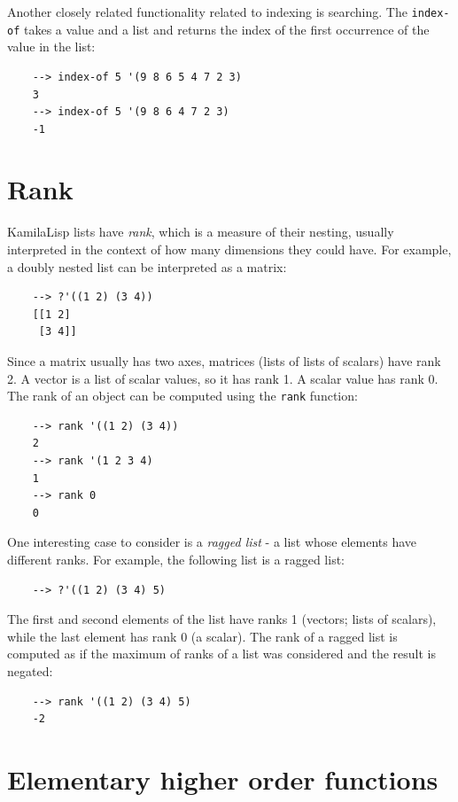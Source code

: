 Another closely related functionality related to indexing is searching. The \verb|index-of| takes a value and a list and returns the index of the first occurrence of the value in the list:

\begin{Verbatim}
    --> index-of 5 '(9 8 6 5 4 7 2 3)
    3
    --> index-of 5 '(9 8 6 4 7 2 3)
    -1
\end{Verbatim}

\section{Rank}

KamilaLisp lists have \textit{rank}, which is a measure of their nesting, usually interpreted in the context of how many dimensions they could have. For example, a doubly nested list can be interpreted as a matrix:

\begin{Verbatim}
    --> ?'((1 2) (3 4))
    [[1 2]
     [3 4]]
\end{Verbatim}

Since a matrix usually has two axes, matrices (lists of lists of scalars) have rank 2. A vector is a list of scalar values, so it has rank 1. A scalar value has rank 0. The rank of an object can be computed using the \verb|rank| function:

\begin{Verbatim}
    --> rank '((1 2) (3 4))
    2
    --> rank '(1 2 3 4)
    1
    --> rank 0
    0
\end{Verbatim}

One interesting case to consider is a \textit{ragged list} - a list whose elements have different ranks. For example, the following list is a ragged list:

\begin{Verbatim}
    --> ?'((1 2) (3 4) 5)
\end{Verbatim}

The first and second elements of the list have ranks 1 (vectors; lists of scalars), while the last element has rank 0 (a scalar). The rank of a ragged list is computed as if the maximum of ranks of a list was considered and the result is negated:

\begin{Verbatim}
    --> rank '((1 2) (3 4) 5)
    -2
\end{Verbatim}

\section{Elementary higher order functions}

